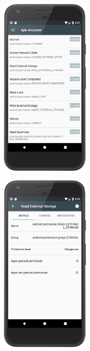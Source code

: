 \begin{minipage}[H] {\textwidth}
\begin{minipage}[t][][b]{0.5\textwidth}
\centering
    \includegraphics[width=4.4cm]{images/app/list_permissions_device.png}
\centering
{}
\label{fig:permission-list}
\end{minipage}%
\hfill
\centering
\begin{minipage}[t][][b]{0.5\textwidth}
\centering
    \includegraphics[width=4.4cm]{images/app/permission_detail_device.png}
\centering
{}
\label{fig:permission-detail}
\end{minipage}%
\end{minipage}


